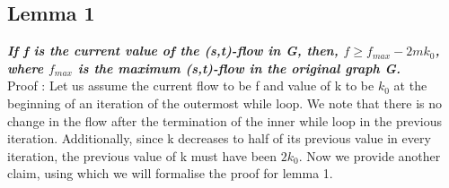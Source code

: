 \documentclass{article}
\begin{document}
\subsection{Lemma 1}

\textbf{\textit{If f is the current value of the (s,t)-flow in G, then, $f \geq f_{max} - 2mk_{0}$, where $f_{max}$ is the maximum (s,t)-flow in the original graph G.}}
\vspace{0.2cm}\\
Proof : Let us assume the current flow to be f and value of k to be $k_{0}$ at the beginning of an iteration of the outermost while loop. We note that there is no change in the flow after the termination of the inner while loop in the previous iteration. Additionally, since k decreases to half of its previous value in every iteration, the previous value of k must have been $2 k_{0}$. Now we provide another claim, using which we will formalise the proof for lemma 1.
\end{document}

